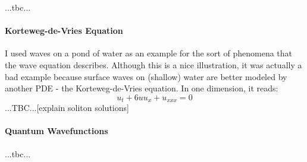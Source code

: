 



 ...tbc...



\paragraph{Korteweg-de-Vries Equation}
I used waves on a pond of water as an example for the sort of phenomena that the wave equation describes. Although this is a nice illustration, it was actually a bad example because surface waves on (shallow) water are better modeled by another PDE - the Korteweg-de-Vries equation. In one dimension, it reads:
\begin{equation}
 u_t + 6 u u_x + u_{xxx} = 0
\end{equation}
...TBC...[explain soliton solutions]



\paragraph{Quantum Wavefunctions} ...tbc...

